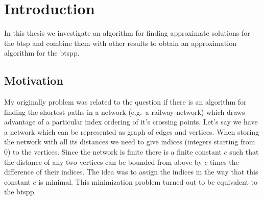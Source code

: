 \chapter{Introduction}

In this thesis we investigate an algorithm for finding approximate solutions for the \gls{btsp} and combine them with other results to obtain an approximation algorithm for the \gls{btspp}.


\section{Motivation}
My originally problem was related to the question if there is an algorithm for finding the shortest paths in a network (e.g.\ a railway network) which draws advantage of a particular index ordering of it's crossing points.
Let's say we have a network which can be represented as graph of edges and vertices. When storing the network with all its distances we need to give indices (integers starting from 0) to the vertices. Since the network is finite there is a finite constant \(c\) such that the distance of any two vertices can be bounded from above by \(c\) times the difference of their indices. The idea was to assign the indices in the way that this constant \(c\) is minimal.
This minimization problem turned out to be equivalent to the \gls{btspp}.
